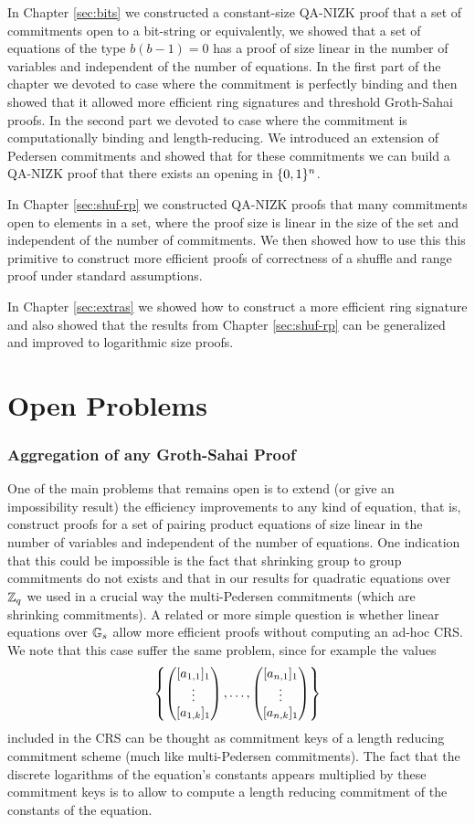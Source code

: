 In Chapter \ref{sec:bits} we constructed a constant-size QA-NIZK proof that a set of commitments open to a bit-string or equivalently, we showed that a set of equations of the type $b(b-1)=0$ has a proof of size linear in the number of variables and independent of the number of equations. In the first part of the chapter we devoted to case where the commitment is perfectly binding and then showed that it allowed more efficient ring signatures and threshold Groth-Sahai proofs. In the second part we devoted to case where the commitment is computationally binding and length-reducing. We introduced an extension of Pedersen commitments and showed that for these commitments we can build a QA-NIZK proof that there exists an opening in $\{0,1\}^n$.

In Chapter \ref{sec:shuf-rp} we constructed QA-NIZK proofs that many commitments open to elements in a set, where the proof size is linear in the size of the set and independent of the number of commitments. We then showed how to use this this primitive to construct more efficient proofs of correctness of a shuffle and range proof under standard assumptions.

In Chapter \ref{sec:extras} we showed how to construct a more efficient ring signature and also showed that the results from Chapter \ref{sec:shuf-rp} can be generalized and improved to logarithmic size proofs.

\section{Open Problems}

\subsubsection{Aggregation of any Groth-Sahai Proof}
One of the main problems that remains open is to extend (or give an impossibility result) the efficiency improvements to any kind of equation, that is, construct proofs for a set of pairing product equations of size linear in the number of variables and independent of the number of equations. One indication that this could be impossible is the fact that shrinking group to group commitments do not exists \cite{EC:AbeHarOhk12} and that in our results for quadratic equations over $\mathbb{Z}_q$ we used in a crucial way the multi-Pedersen commitments (which are shrinking commitments). A related or more simple question is whether linear equations over $\mathbb{G}_s$ allow more efficient proofs without computing an ad-hoc CRS. We note that this case suffer the same problem, since for example the values 
$$\left\{\left(\begin{matrix}{[a_{1,1}]_1}\\\vdots\\{[a_{1,k}]_1}\end{matrix}\right),\ldots,\left(\begin{matrix}{[a_{n,1}]_1}\\\vdots\\{[a_{n,k}]_1}\end{matrix}\right)\right\}$$
included in the CRS can be thought as commitment keys of a length reducing commitment scheme (much like multi-Pedersen commitments). The fact that the discrete logarithms of the equation's constants appears multiplied by these commitment keys is to allow to compute a length reducing commitment of the constants of the equation.

